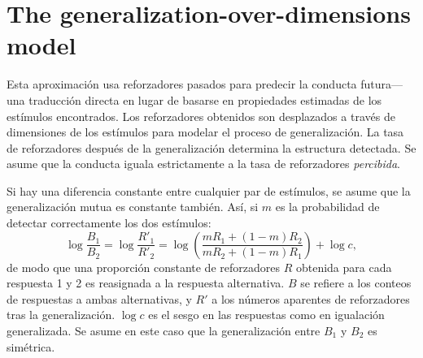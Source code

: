 \documentclass[a4paper,12pt]{article}
\begin{document}
\section{The generalization-over-dimensions model}

Esta aproximación usa reforzadores pasados para predecir la conducta futura---una traducción directa en lugar de basarse en propiedades estimadas de los estímulos encontrados. Los reforzadores obtenidos son desplazados a través de dimensiones de los estímulos para modelar el proceso de generalización. La tasa de reforzadores después de la generalización determina la estructura detectada. Se asume que la conducta iguala estrictamente a la tasa de reforzadores {\itshape percibida}.

\vspace{2mm}
{\centering{}}
\vspace{2mm}

Si hay una diferencia constante entre cualquier par de estímulos, se asume que la generalización mutua es constante también. Así, si $m$ es la probabilidad de detectar correctamente los dos estímulos:
\[
    \log\frac{B_1}{B_2} = \log\frac{R'_1}{R'_2} = \log \left(\frac{
            mR_1 + (1 - m) R_2
        }{
            mR_2 + (1 - m) R_1
    }\right) + \log c
,\]
de modo que una proporción constante de reforzadores $R$ obtenida para cada respuesta 1 y 2 es reasignada a la respuesta alternativa. $B$ se refiere a los conteos de respuestas a ambas alternativas, y $R'$ a los números aparentes de reforzadores tras la generalización. $\log c$ es el sesgo en las respuestas como en igualación generalizada. Se asume en este caso que la generalización entre $B_1$ y $B_2$ es simétrica.
\end{document}
